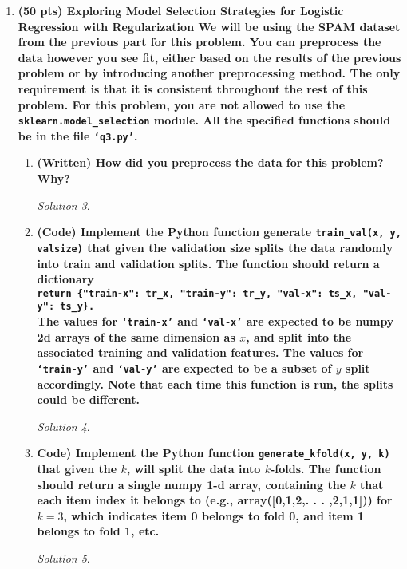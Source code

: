 \documentclass[a4paper,12pt]{article}
\theoremstyle{definition}
\theoremstyle{remark}
\newtheorem*{solution}{Solution}
\begin{document}
\begin{enumerate}
\begin{enumerate}
\begin{solution}
			\end{solution}
			\item {\bf (Written) Given your results in 2c, 2e, and 2f, discuss how the preprocessing affects the models (Logistic and Naive Bayes) with regards to ROC, AUC, and accuracy. Also, comment on how Naive Bayes performance compares with logistic regression}
			\begin{solution}
				
				
			\end{solution}
		\end{enumerate}
		\item {\bf (50 pts) Exploring Model Selection Strategies for Logistic Regression with Regularization
			We will be using the SPAM dataset from the previous part for this problem. You can preprocess the data
			however you see fit, either based on the results of the previous problem or by introducing another
			preprocessing method. The only requirement is that it is consistent throughout the rest of this problem.
			For this problem, you are not allowed to use the \texttt{sklearn.model\_selection} module. All the specified functions should be in the file \texttt{‘q3.py’}.}
	
		\begin{enumerate}
			\item {\bf (Written) How did you preprocess the data for this problem? Why?}
			\begin{solution}
				
			\end{solution}
			\item {\bf (Code) Implement the Python function generate \texttt{train\_val(x, y, valsize)} that given the validation size splits the data randomly into train and validation splits. The function should return a dictionary \\
				\texttt{return \{"train-x": tr\_x, "train-y": tr\_y, "val-x": ts\_x, "val-y": ts\_y\}.}\\ 
				The values for \texttt{‘train-x’} and \texttt{‘val-x’} are expected to be numpy 2d arrays of the same dimension as $x$, and split into the associated training and validation features. The values for \texttt{‘train-y’} and \texttt{‘val-y’} are expected to be a subset
				of $y$ split accordingly. Note that each time this function is run, the splits could be different.}
			\begin{solution}
			
			\end{solution}
			\item {\bf Code) Implement the Python function \texttt{generate\_kfold(x, y, k)} that given the $k$, will split the data into $k$-folds. The function should return a single numpy 1-d array, containing the $k$ that each item index it belongs to (e.g., array([0,1,2,. . . ,2,1,1])) for $k=3$, which indicates item 0 belongs to fold 0, and item 1 belongs to fold 1, etc.}
			\begin{solution}
			

\end{solution}
\end{enumerate}
\end{enumerate}
\end{document}
